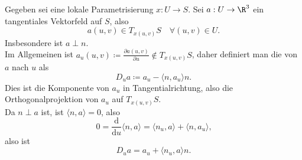 \begin{definition}
  Gegeben sei eine lokale Parametrisierung \( x: U \to S \). Sei \( a : U \to \R^3 \) ein tangentiales Vektorfeld auf \( S \), also
  \begin{equation*}
    a(u,v) \in T_{x(u,v)}S \quad \forall (u,v) \in U\text{.}
  \end{equation*}
  Insbesondere ist \( a \perp n \). \\
  Im Allgemeinen ist \( a_u(u,v) \coloneqq \frac{\partial a(u,v)}{\partial u} \not \in T_{x(u,v)}S \), daher definiert man die \label{def:kovarianteAbleitung} von \( a \) nach \( u \) als
  \begin{equation*}
    D_u a \coloneqq a_u - \langle n, a_u \rangle n\text{.}
  \end{equation*}
  Dies ist die Komponente von \( a_u \) in Tangentialrichtung, also die Orthogonalprojektion von \( a_u \) auf \( T_{x(u,v)}S \). \\
  Da \( n \perp a \) ist, ist \( \langle n, a \rangle = 0 \), also
  \begin{equation*}
    0 = \frac{\text{d}}{\text{d}u}\langle n,a \rangle = \langle n_u, a \rangle + \langle n, a_u \rangle\text{,}
  \end{equation*}
  also ist
  \begin{equation*}
    D_u a = a_u + \langle n_u, a \rangle n\text{.}
  \end{equation*}
\end{definition}

